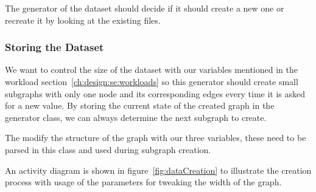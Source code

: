 The generator of the dataset should decide if it should create a new one or recreate it by looking at the existing files.

\subsubsection{Storing the Dataset}
\label{ch:design:se:storingTheDataset}
We want to control the size of the dataset with our variables mentioned in the workload section~\ref{ch:design:se:workloads} so this generator should create small subgraphs with only one node and its corresponding edges every time it is asked for a new value.
By storing the current state of the created graph in the generator class,
we can always determine the next subgraph to create.

The modify the structure of the graph with our three variables,
these need to be parsed in this class and used during subgraph creation.

An activity diagram is shown in figure~\ref{fig:dataCreation} to illustrate the creation process with usage of the parameters for tweaking the width of the graph.

